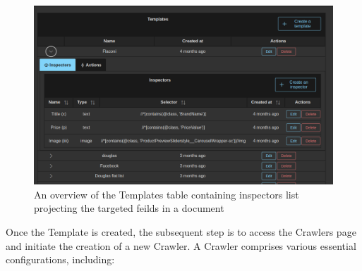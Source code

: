 \begin{figure}[h]	
     \centering
     \includegraphics[width=13cm]{images/demo-3.png}
     \caption{An overview of the Templates table containing inspectors list projecting the targeted feilds in a document}
     \label{fig:software-arch}
\end{figure}

Once the Template is created, the subsequent step is to access the Crawlers page and initiate the creation of a new Crawler. A Crawler comprises various essential configurations, including:

